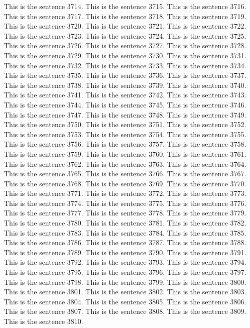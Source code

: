\documentclass{article}
\begin{document}
This is the sentence 3714.
This is the sentence 3715.
This is the sentence 3716.
This is the sentence 3717.
This is the sentence 3718.
This is the sentence 3719.
This is the sentence 3720.
This is the sentence 3721.
This is the sentence 3722.
This is the sentence 3723.
This is the sentence 3724.
This is the sentence 3725.
This is the sentence 3726.
This is the sentence 3727.
This is the sentence 3728.
This is the sentence 3729.
This is the sentence 3730.
This is the sentence 3731.
This is the sentence 3732.
This is the sentence 3733.
This is the sentence 3734.
This is the sentence 3735.
This is the sentence 3736.
This is the sentence 3737.
This is the sentence 3738.
This is the sentence 3739.
This is the sentence 3740.
This is the sentence 3741.
This is the sentence 3742.
This is the sentence 3743.
This is the sentence 3744.
This is the sentence 3745.
This is the sentence 3746.
This is the sentence 3747.
This is the sentence 3748.
This is the sentence 3749.
This is the sentence 3750.
This is the sentence 3751.
This is the sentence 3752.
This is the sentence 3753.
This is the sentence 3754.
This is the sentence 3755.
This is the sentence 3756.
This is the sentence 3757.
This is the sentence 3758.
This is the sentence 3759.
This is the sentence 3760.
This is the sentence 3761.
This is the sentence 3762.
This is the sentence 3763.
This is the sentence 3764.
This is the sentence 3765.
This is the sentence 3766.
This is the sentence 3767.
This is the sentence 3768.
This is the sentence 3769.
This is the sentence 3770.
This is the sentence 3771.
This is the sentence 3772.
This is the sentence 3773.
This is the sentence 3774.
This is the sentence 3775.
This is the sentence 3776.
This is the sentence 3777.
This is the sentence 3778.
This is the sentence 3779.
This is the sentence 3780.
This is the sentence 3781.
This is the sentence 3782.
This is the sentence 3783.
This is the sentence 3784.
This is the sentence 3785.
This is the sentence 3786.
This is the sentence 3787.
This is the sentence 3788.
This is the sentence 3789.
This is the sentence 3790.
This is the sentence 3791.
This is the sentence 3792.
This is the sentence 3793.
This is the sentence 3794.
This is the sentence 3795.
This is the sentence 3796.
This is the sentence 3797.
This is the sentence 3798.
This is the sentence 3799.
This is the sentence 3800.
This is the sentence 3801.
This is the sentence 3802.
This is the sentence 3803.
This is the sentence 3804.
This is the sentence 3805.
This is the sentence 3806.
This is the sentence 3807.
This is the sentence 3808.
This is the sentence 3809.
This is the sentence 3810.
\end{document}
